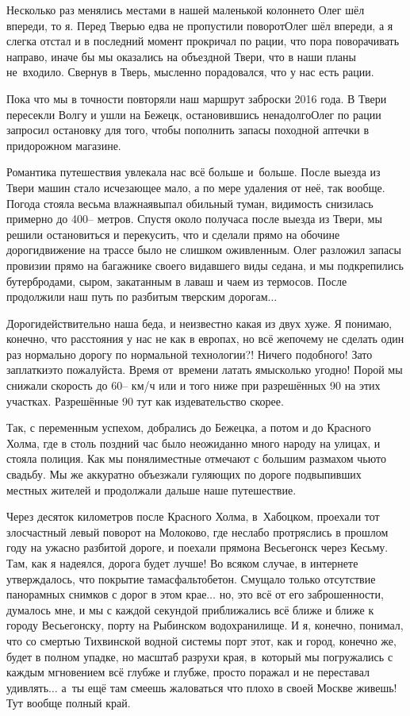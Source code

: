Несколько раз менялись местами в нашей маленькой колонне\mdash то Олег шёл впереди, то я. Перед Тверью едва не пропустили поворот\mdash Олег шёл впереди, а я слегка отстал и в последний момент прокричал по рации, что пора поворачивать направо, иначе бы мы оказались на объездной Твери, что в наши планы не~входило. Свернув в Тверь, мысленно порадовался, что у нас есть рации.

Пока что мы в точности повторяли наш маршрут заброски 2016 года. В Твери пересекли Волгу и ушли на Бежецк, остановившись ненадолго\mdash Олег по рации запросил остановку для того, чтобы пополнить запасы походной аптечки в придорожном магазине. 

Романтика путешествия увлекала нас всё больше и~больше. После выезда из Твери машин стало исчезающее мало, а по мере удаления от неё, так вообще. Погода стояла весьма влажная\mdash выпал обильный туман, видимость снизилась примерно до 400\thinspace\nobreakdash-- метров. Спустя около получаса после выезда из Твери, мы решили остановиться и перекусить, что и сделали прямо на обочине дороги\mdash движение на трассе было не слишком оживленным. Олег разложил запасы провизии прямо на багажнике своего видавшего виды седана, и мы подкрепились бутербродами, сыром, закатанным в лаваш и чаем из термосов. После продолжили наш путь по разбитым тверским дорогам$\ldots$

Дороги\mdash действительно наша беда, и неизвестно какая из двух хуже. Я понимаю, конечно, что расстояния у нас не как в европах, но всё же\mdash почему не сделать один раз нормально дорогу по нормальной технологии?! Ничего подобного! Зато заплатки\mdash это пожалуйста. Время от~времени латать ямы\mdash сколько угодно! Порой мы снижали скорость до 60\thinspace\nobreakdash-- км/ч или и того ниже при разрешённых 90 на этих участках. Разрешённые 90 тут как издевательство скорее. 

Так, с переменным успехом, добрались до Бежецка, а потом и до Красного Холма, где в столь поздний час было неожиданно много народу на улицах, и стояла полиция. Как мы поняли\mdash местные отмечают с большим размахом чью\sdash то свадьбу. Мы же аккуратно объезжали гуляющих по дороге подвыпивших местных жителей и продолжали дальше наше путешествие. 

Через десяток километров после Красного Холма, в~Хабоцком, проехали тот злосчастный левый поворот на Молоково, где неслабо протряслись в прошлом году на ужасно разбитой дороге, и поехали прямо\mdash на Весьегонск через Кесьму. Там, как я надеялся, дорога будет лучше! Во всяком случае, в интернете утверждалось, что покрытие там\mdash асфальтобетон. Смущало только отсутствие панорамных снимков с дорог в этом крае$\ldots$ но, это всё от его заброшенности, думалось мне, и мы с каждой секундой приближались всё ближе и ближе к городу Весьегонску, порту на Рыбинском водохранилище. И я, конечно, понимал, что со смертью Тихвинской водной системы порт этот, как и город, конечно же, будет в полном упадке, но масштаб разрухи края, в~который мы погружались с каждым мгновением всё глубже и глубже, просто поражал и не переставал удивлять$\ldots$ а~ты ещё там смеешь жаловаться что плохо в своей Москве живешь! Тут вообще полный край. 

